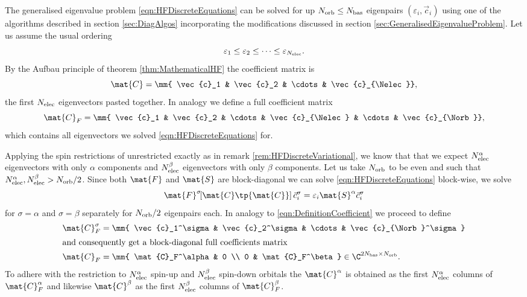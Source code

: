 \begin{rem}
The generalised eigenvalue problem \eqref{eqn:HFDiscreteEquations}
can be solved for up $N_\text{orb} \leq N_\text{bas}$ eigenpairs
$(\varepsilon_i, \vec{c}_i)$
using one of the algorithms described in section \vref{sec:DiagAlgos}
incorporating the modifications discussed in
section \ref{sec:GeneralisedEigenvalueProblem}.
Let us assume the usual ordering
\[ \varepsilon_1 \leq \varepsilon_2 \leq \cdots \leq \varepsilon_{N_\text{elec}}. \]
By the Aufbau principle of theorem \ref{thm:MathematicalHF}
the coefficient matrix is
\[ \mat{C} = \mm{ \vec{c}_1 & \vec{c}_2 & \cdots & \vec{c}_{\Nelec}}, \]
\ie the first $N_\text{elec}$ eigenvectors pasted together.
In analogy we define a full coefficient matrix
\begin{equation}
	\mat{C}_F = \mm{ \vec{c}_1 & \vec{c}_2 & \cdots & \vec{c}_{\Nelec} & \cdots & \vec{c}_{\Norb}},
	\label{eqn:DefinitionCoefficient}
\end{equation}
which contains all eigenvectors we solved \eqref{eqn:HFDiscreteEquations} for.

Applying the spin restrictions of unrestricted \HF
exactly as in remark \ref{rem:HFDiscreteVariational},
we know that that we expect $N_\text{elec}^\alpha$ eigenvectors
with only $\alpha$ components and $N_\text{elec}^\beta$ eigenvectors with only $\beta$ components.
Let us take $N_\text{orb}$ to be even and such that $N_\text{elec}^\alpha, N_\text{elec}^\beta > N_\text{orb}/2$.
Since both $\mat{F}$ and $\mat{S}$ are block-diagonal
we can solve \eqref{eqn:HFDiscreteEquations} block-wise,
\ie we solve
\[
	\mat{F}^\sigma\!\!\left[\mat{C}\tp{\mat{C}}\right] \vec{c}_i^\sigma
	= \varepsilon_i \mat{S}^\alpha \vec{c}_i^\sigma
\]
for $\sigma = \alpha$ and $\sigma = \beta$
separately for $N_\text{orb}/2$ eigenpairs each.
In analogy to \eqref{eqn:DefinitionCoefficient} we proceed to define
\begin{align*}
	 \mat{C}_F^\sigma &= \mm{ \vec{c}_1^\sigma & \vec{c}_2^\sigma &
		\cdots & \vec{c}_{\Norb}^\sigma} \\
\intertext{and consequently get a block-diagonal full coefficients matrix}
	\mat{C}_F &= \mm{ \mat{C}_F^\alpha & 0 \\ 0 & \mat{C}_F^\beta }
		\in \C^{2\Nbas\times \Norb}.
\end{align*}
To adhere with the restriction to $N_\text{elec}^\alpha$ spin-up
and $N_\text{elec}^\beta$ spin-down orbitals
the 
$\mat{C}^\alpha$ is obtained as the first $N_\text{elec}^\alpha$ columns of $\mat{C}_F^\alpha$
and likewise $\mat{C}^\beta$ as the first $N_\text{elec}^\beta$ columns of $\mat{C}_F^\beta$.


\end{rem}
